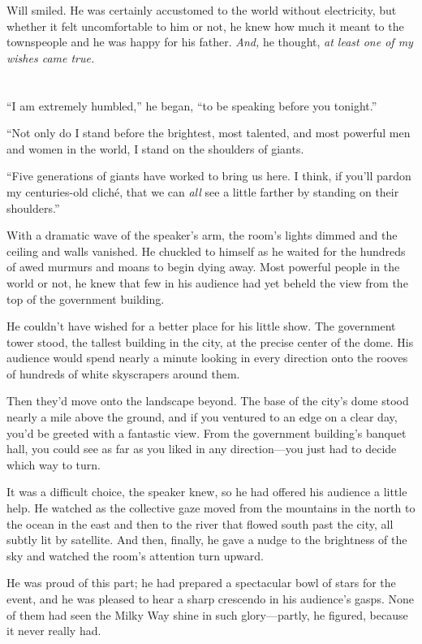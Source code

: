 \documentclass[12pt,letterpaper,oneside,english]{book}
\begin{document}
Will smiled. He was certainly accustomed to the world without electricity,
but whether it felt uncomfortable to him or not, he knew how much it meant
to the townspeople and he was happy for his father. \textit{And,} he
thought, \textit{at least one of my wishes came true.}


\chapter{} %

``I am extremely humbled,'' he began, ``to be speaking before you
tonight.''

``Not only do I stand before the brightest, most talented, and most
powerful men and women in the world, I stand on the shoulders of giants.

``Five generations of giants have worked to bring us here. I think, if
you'll pardon my centuries-old clich\'e, that we can \emph{all} see a
little farther by standing on their shoulders.''

With a dramatic wave of the speaker's arm, the room's lights dimmed and
the ceiling and walls vanished. He chuckled to himself as he waited for
the hundreds of awed murmurs and moans to begin dying away. Most
powerful people in the world or not, he knew that few in his audience
had yet beheld the view from the top of the government building.

He couldn't have wished for a better place for his little show. The
government tower stood, the tallest building in the city, at the precise
center of the dome. His audience would spend nearly a minute looking
in every direction onto the rooves of hundreds of white skyscrapers
around them.

Then they'd move onto the landscape beyond. The base of the city's dome
stood nearly a mile above the ground, and if you ventured to an edge on
a clear day, you'd be greeted with a fantastic view. From the government
building's banquet hall, you could see as far as you liked in any
direction---you just had to decide which way to turn.

It was a difficult choice, the speaker knew, so he had offered his
audience a little help. He watched as the collective gaze moved from the
mountains in the north to the ocean in the east and then to the river
that flowed south past the city, all subtly lit by satellite. And then,
finally, he gave a nudge to the brightness of the sky and watched the
room's attention turn upward.

He was proud of this part; he had prepared a spectacular bowl of stars
for the event, and he was pleased to hear a sharp crescendo in his
audience's gasps. None of them had seen the Milky Way shine in such
glory---partly, he figured, because it never really had.
\end{document}

